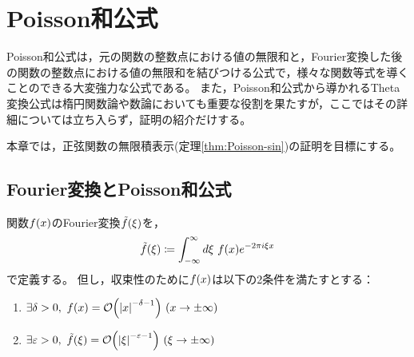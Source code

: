 \documentclass[a4paper,draft]{ltjsarticle}
\begin{document}
\section{Poisson和公式}\label{sec:Poisson}
Poisson和公式は，元の関数の整数点における値の無限和と，Fourier変換した後の関数の整数点における値の無限和を結びつける公式で，様々な関数等式を導くことのできる大変強力な公式である。
また，Poisson和公式から導かれるTheta変換公式は楕円関数論や数論においても重要な役割を果たすが，ここではその詳細については立ち入らず，証明の紹介だけする。

本章では，正弦関数の無限積表示(定理\ref{thm:Poisson-sin})の証明を目標にする。

\subsection{Fourier変換とPoisson和公式}
\begin{defi}[Fourier変換]
    関数$\fun{f}{x}$のFourier変換$\fun{\tilde{f}}{\xi}$を，
    \begin{equation}
        \fun{\tilde{f}}{\xi}\coloneqq \int_{-\infty}^\infty d\xi\ \fun{f}{x}e^{-2\pi i \xi x}
    \end{equation}
    で定義する。
    但し，収束性のために$\fun{f}{x}$は以下の2条件を満たすとする：
    \begin{enumerate}[label=(\roman*)]
        \item $\exists \delta>0,\ \fun{f}{x}=\fun{\mathcal{O}}{\abs{x}^{-\delta -1}}\ \pare{x\to\pm\infty}$
        \item $\exists \varepsilon>0,\ \fun{\tilde{f}}{\xi}=\fun{\mathcal{O}}{\abs{\xi}^{-\varepsilon-1}}\ \pare{\xi\to\pm\infty}$
    \end{enumerate}
\end{defi}
\end{document}
